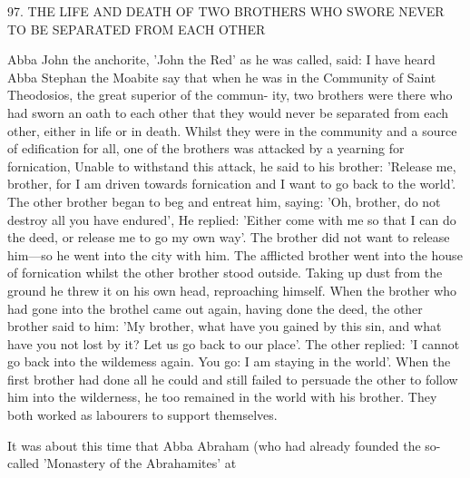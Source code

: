 97.
THE LIFE AND DEATH OF TWO BROTHERS
WHO SWORE NEVER TO BE SEPARATED FROM EACH OTHER

Abba John the anchorite, 'John the Red' as he was called, said: I
have heard Abba Stephan the Moabite say that when he was in the
Community of Saint Theodosios, the great superior of the commun-
ity, two brothers were there who had sworn an oath to each other
that they would never be separated from each other, either in life or
in death.
Whilst they were in the community and a source of
edification for all, one of the brothers was attacked by a yearning
for fornication, Unable to withstand this attack, he said to his
brother: 'Release me, brother, for I am driven towards fornication
and I want to go back to the world'.
The other brother began to
beg and entreat him, saying: 'Oh, brother, do not destroy all you
have endured', He replied: 'Either come with me so that I can do
the deed, or release me to go my own way'.
The brother did not
want to release him—so he went into the city with him.
The
afflicted brother went into the house of fornication whilst the other
brother stood outside.
Taking up dust from the ground he threw it
on his own head, reproaching himself.
When the brother who had
gone into the brothel came out again, having done the deed, the
other brother said to him: 'My brother, what have you gained by
this sin, and what have you not lost by it? Let us go back to our
place'.
The other replied: 'I cannot go back into the wildemess
again.
You go: I am staying in the world'.
When the first brother
had done all he could and still failed to persuade the other to follow
him into the wilderness, he too remained in the world with his
brother.
They both worked as labourers to support themselves.

It was about this time that Abba Abraham (who had already
founded the so-called 'Monastery of the Abrahamites' at

